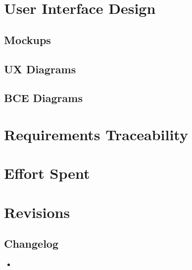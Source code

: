 \documentclass[english]{article}
\begin{document}
\newpage

\section{User Interface Design}

\subsection{Mockups}

\subsection{UX Diagrams}

\subsection{BCE Diagrams}

\newpage

\section{Requirements Traceability}

\newpage

\section{Effort Spent}

\newpage

\section{Revisions}

\subsection{Changelog}
\begin{itemize}
  \item{}
\end{itemize}
\end{document}

